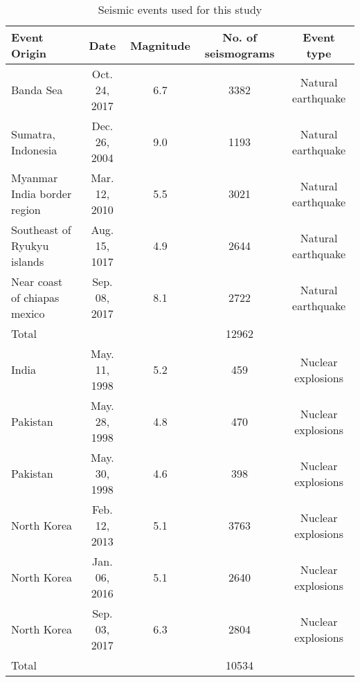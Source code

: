 \documentclass[12pt]{article}
\begin{document}
    \begin{table}[ht]
        \caption{Seismic events used for this study}
        \label{tab:events_list}
        \centering
        \begin{tabular}{ l c c c c}
        \hline
         Event Origin & Date & Magnitude & No. of seismograms & Event type \\
         \hline 
          
         Banda Sea & Oct. 24, 2017 & 6.7 & 3382 & Natural earthquake\\
         Sumatra, Indonesia & Dec. 26, 2004 & 9.0 & 1193 & Natural earthquake \\
         Myanmar India border region & Mar. 12, 2010 & 5.5 & 3021 & Natural earthquake \\
         Southeast of Ryukyu islands & Aug. 15, 1017 & 4.9 & 2644 & Natural earthquake \\
         Near coast of chiapas mexico & Sep. 08, 2017 & 8.1  & 2722 & Natural earthquake \\
         \hline
         Total & & & 12962 &\\
         \hline
         \hline
         India & May. 11, 1998 & 5.2 & 459 & Nuclear explosions \\
         Pakistan & May. 28, 1998 & 4.8 & 470 & Nuclear explosions \\
         Pakistan & May. 30, 1998 & 4.6 & 398 & Nuclear explosions \\
         North Korea & Feb. 12, 2013 & 5.1  & 3763 & Nuclear explosions \\
         North Korea & Jan. 06, 2016 & 5.1  & 2640 & Nuclear explosions \\
         North Korea & Sep. 03, 2017 & 6.3  & 2804 & Nuclear explosions \\
         \hline
         Total & & & 10534 &\\
         \hline
        \end{tabular}
    \end{table}
\end{document}
